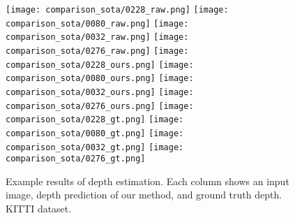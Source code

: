 \documentclass[10pt,twocolumn,letterpaper]{article}
\begin{document}
\begin{figure*}[t]
    \centering
    \texttt{[image: comparison\_sota/0228\_raw.png]}
    \texttt{[image: comparison\_sota/0080\_raw.png]}
    \texttt{[image: comparison\_sota/0032\_raw.png]}
    \texttt{[image: comparison\_sota/0276\_raw.png]}
    \texttt{[image: comparison\_sota/0228\_ours.png]}
    \texttt{[image: comparison\_sota/0080\_ours.png]}
    \texttt{[image: comparison\_sota/0032\_ours.png]}
    \texttt{[image: comparison\_sota/0276\_ours.png]}
    \texttt{[image: comparison\_sota/0228\_gt.png]}
    \texttt{[image: comparison\_sota/0080\_gt.png]}
    \texttt{[image: comparison\_sota/0032\_gt.png]}
    \texttt{[image: comparison\_sota/0276\_gt.png]}
    \caption{Example results of depth estimation. Each column shows an input image, depth prediction of our method, and ground truth depth. KITTI dataset.}
    \label{fig:main_kitti}
\end{figure*}
\end{document}
